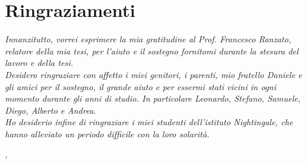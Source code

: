 
\cleardoublepage
{}
{}

\bigskip

\begingroup
\let\clearpage\relax
\let\cleardoublepage\relax
\let\cleardoublepage\relax

\chapter*{Ringraziamenti}

\noindent \textit{Innanzitutto, vorrei esprimere la mia gratitudine al Prof. Francesco Ranzato, relatore della mia tesi, per l'aiuto e il sostegno fornitomi durante la stesura del lavoro e della tesi.}\\

\noindent \textit{Desidero ringraziare con affetto i miei genitori, i parenti, mio fratello Daniele e gli amici per il sostegno, il grande aiuto e per essermi stati vicini in ogni momento durante gli anni di studio. In particolare
Leonardo, Stefano, Samuele, Diego, Alberto e Andrea.}\\

\noindent \textit{Ho desiderio infine di ringraziare i miei studenti dell'istituto Nightingale, che hanno alleviato un periodo difficile con la loro solarità.}\\
\bigskip

\noindent\textit{\myLocation, \myTime}
\hfill \myName

\endgroup


